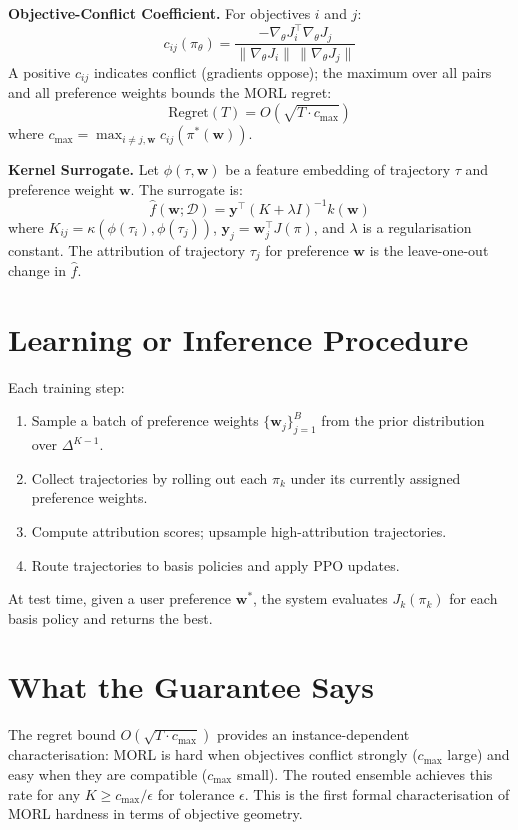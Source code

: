 \documentclass[10pt,twocolumn]{article}
\begin{document}
\textbf{Objective-Conflict Coefficient.} For objectives $i$ and $j$:
\[
c_{ij}(\pi_\theta) = \frac{-\nabla_\theta J_i^\top \nabla_\theta J_j}
  {\|\nabla_\theta J_i\|\,\|\nabla_\theta J_j\|}
\]
A positive $c_{ij}$ indicates conflict (gradients oppose); the maximum
over all pairs and all preference weights bounds the MORL regret:
\[
\text{Regret}(T) = O\!\left(\sqrt{T \cdot c_{\max}}\right)
\]
where $c_{\max} = \max_{i \neq j, \mathbf{w}} c_{ij}(\pi^*(\mathbf{w}))$.

\textbf{Kernel Surrogate.} Let $\phi(\tau, \mathbf{w})$ be a feature
embedding of trajectory $\tau$ and preference weight $\mathbf{w}$.
The surrogate is:
\[
\hat{f}(\mathbf{w}; \mathcal{D}) =
  \mathbf{y}^\top (K + \lambda I)^{-1} k(\mathbf{w})
\]
where $K_{ij} = \kappa(\phi(\tau_i), \phi(\tau_j))$,
$\mathbf{y}_j = \mathbf{w}_j^\top J(\pi)$, and $\lambda$ is a
regularisation constant. The attribution of trajectory $\tau_j$ for
preference $\mathbf{w}$ is the leave-one-out change in $\hat{f}$.

\section{Learning or Inference Procedure}

Each training step:
\begin{enumerate}[itemsep=2pt,parsep=0pt]
  \item Sample a batch of preference weights $\{\mathbf{w}_j\}_{j=1}^B$
    from the prior distribution over $\Delta^{K-1}$.
  \item Collect trajectories by rolling out each $\pi_k$ under its
    currently assigned preference weights.
  \item Compute attribution scores; upsample high-attribution trajectories.
  \item Route trajectories to basis policies and apply PPO updates.
\end{enumerate}

At test time, given a user preference $\mathbf{w}^*$, the system
evaluates $J_k(\pi_k)$ for each basis policy and returns the best.

\section{What the Guarantee Says}

The regret bound $O(\sqrt{T \cdot c_{\max}})$ provides an
instance-dependent characterisation: MORL is hard when objectives
conflict strongly ($c_{\max}$ large) and easy when they are compatible
($c_{\max}$ small). The routed ensemble achieves this rate for any
$K \geq c_{\max} / \epsilon$ for tolerance $\epsilon$.
This is the first formal characterisation of MORL hardness in terms
of objective geometry.
\end{document}

